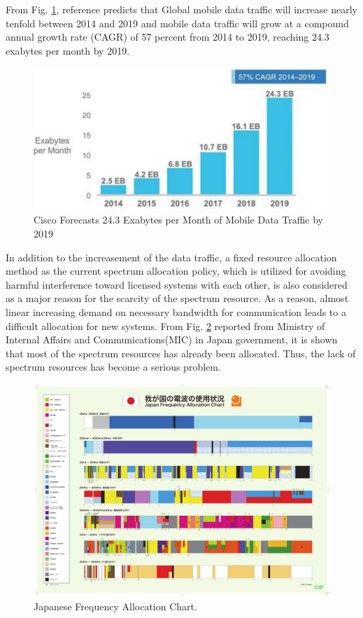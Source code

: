  From Fig. \ref{fig:Cisco}, reference \cite{ref:Cisco} predicts that Global mobile data traffic will increase nearly tenfold between 2014 and 2019 and mobile data traffic will grow at a compound annual growth rate (CAGR) of 57 percent from 2014 to 2019, reaching 24.3 exabytes per month by 2019. 
\begin{figure}[!htp]
\includegraphics[width=150mm,clip]{traffic_trend.pdf}
\caption{Cisco Forecasts 24.3 Exabytes per Month of Mobile Data Traffic by 2019}
\label{fig:Cisco}
\end{figure}
In addition to the increasement of the data traffic, a fixed resource allocation method as the current spectrum allocation policy, which is utilized for avoiding harmful interference toward licensed systems with each other, is also considered as a major reason for the scarcity of the spectrum resource. As a reason, almost linear increasing demand on necessary bandwidth for communication leads to a difficult allocation for new systems. From Fig. \ref{fig:MIC} reported from Ministry of Internal Affairs and Communications(MIC) in Japan government, it is shown that most of the spectrum resources has already been allocated. Thus, the lack of spectrum resources has become a serious problem.
\begin{figure}[!htp]
\includegraphics[width=150mm,clip]{frequency_alloc.pdf}
\caption{Japanese Frequency Allocation Chart.}
\label{fig:MIC}
\end{figure}

